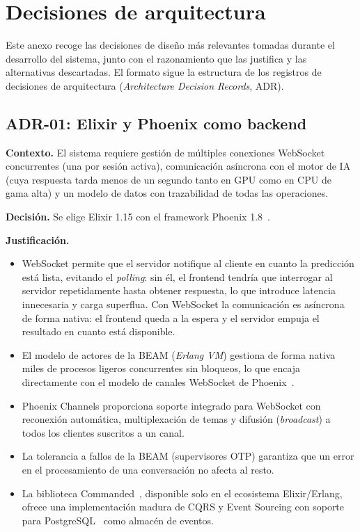 \chapter{Decisiones de arquitectura}
\label{cap:AnexoE}

Este anexo recoge las decisiones de diseño más relevantes tomadas durante el desarrollo del sistema, junto con el razonamiento que las justifica y las alternativas descartadas. El formato sigue la estructura de los registros de decisiones de arquitectura (\emph{Architecture Decision Records}, ADR).

\section{ADR-01: Elixir y Phoenix como backend}

\textbf{Contexto.} El sistema requiere gestión de múltiples conexiones WebSocket concurrentes (una por sesión activa), comunicación asíncrona con el motor de IA (cuya respuesta tarda menos de un segundo tanto en GPU como en CPU de gama alta) y un modelo de datos con trazabilidad de todas las operaciones.

\textbf{Decisión.} Se elige Elixir 1.15 con el framework Phoenix 1.8~\cite{phoenix2024}.

\textbf{Justificación.}
\begin{itemize}
    \item WebSocket permite que el servidor notifique al cliente en cuanto la predicción está lista, evitando el \emph{polling}: sin él, el frontend tendría que interrogar al servidor repetidamente hasta obtener respuesta, lo que introduce latencia innecesaria y carga superflua. Con WebSocket la comunicación es asíncrona de forma nativa: el frontend queda a la espera y el servidor empuja el resultado en cuanto está disponible.
    \item El modelo de actores de la BEAM (\emph{Erlang VM}) gestiona de forma nativa miles de procesos ligeros concurrentes sin bloqueos, lo que encaja directamente con el modelo de canales WebSocket de Phoenix~\cite{phoenix2024}.
    \item Phoenix Channels proporciona soporte integrado para WebSocket con reconexión automática, multiplexación de temas y difusión (\emph{broadcast}) a todos los clientes suscritos a un canal.
    \item La tolerancia a fallos de la BEAM (supervisores OTP) garantiza que un error en el procesamiento de una conversación no afecta al resto.
    \item La biblioteca Commanded~\cite{commanded2024}, disponible solo en el ecosistema Elixir/Erlang, ofrece una implementación madura de CQRS y Event Sourcing con soporte para PostgreSQL~\cite{postgresql2024} como almacén de eventos.
\end{itemize}


